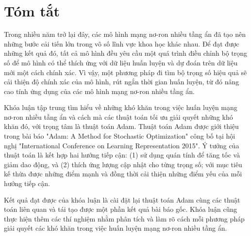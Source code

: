 \chapter*{Tóm tắt}
\label{summary}

Trong nhiều năm trở lại đây, các mô hình mạng nơ-ron nhiều tầng ẩn đã tạo nên những bước cải tiến lớn trong vô số lĩnh vực khoa học khác nhau. Để đạt được những kết quả đó, tất cả mô hình đều yêu cầu một quá trình điều chỉnh bộ trọng số để mô hình có thể thích ứng với dữ liệu huấn luyện và dự đoán trên dữ liệu mới một cách chính xác. Vì vậy, một phương pháp đi tìm bộ trọng số hiệu quả sẽ cải thiện độ chính xác của mô hình, rút ngắn thời gian huấn luyện, từ đó nâng cao tính ứng dụng của các mô hình mạng nơ-ron nhiều tầng ẩn.

Khóa luận tập trung tìm hiểu về những khó khăn trong việc huấn luyện mạng nơ-ron nhiều tầng ẩn và cách mà các thuật toán tối ưu giải quyết những khó khăn đó, với trọng tâm là thuật toán Adam. Thuật toán Adam được giới thiệu trong bài báo "Adam: A Method for Stochastic Optimization" công bố tại hội nghị "International Conference on Learning Representation 2015". Ý tưởng của thuật toán là kết hợp hai hướng tiếp cận: (1) sử dụng quán tính để tăng tốc và giảm dao động, và (2) thích ứng lượng cập nhật cho từng trọng số; với mục tiêu kế thừa được những điểm mạnh và đồng thời cải thiện những điểm yếu của mỗi hướng tiếp cận.

Kết quả đạt được của khóa luận là cài đặt lại thuật toán Adam cùng các thuật toán liên quan và tái tạo được một phần kết quả bài báo gốc. Khóa luận cũng thực hiện thêm các thí nghiệm nhằm phân tích và làm rõ cách mỗi phương pháp giải quyết các khó khăn trong việc huấn luyện mạng nơ-ron nhiều tầng ẩn.